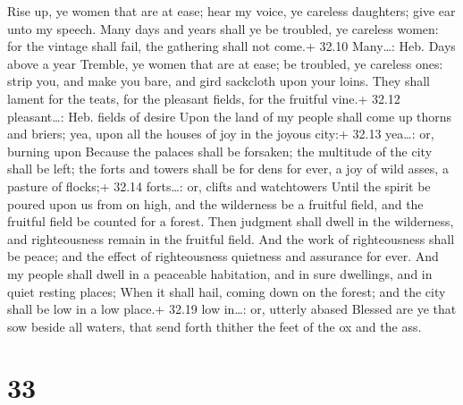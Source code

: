  Rise up, ye women that are at ease; hear my voice, ye
careless daughters; give ear unto my speech.  Many days and
years shall ye be troubled, ye careless women: for the vintage shall
fail, the gathering shall not come.+ 32.10 Many\ldots: Heb. Days above a
year  Tremble, ye women that are at ease; be troubled, ye
careless ones: strip you, and make you bare, and gird sackcloth upon
your loins.  They shall lament for the teats, for the
pleasant fields, for the fruitful vine.+ 32.12 pleasant\ldots: Heb.
fields of desire  Upon the land of my people shall come up
thorns and briers; yea, upon all the houses of joy in the joyous city:+
32.13 yea\ldots: or, burning upon  Because the palaces
shall be forsaken; the multitude of the city shall be left; the forts
and towers shall be for dens for ever, a joy of wild asses, a pasture of
flocks;+ 32.14 forts\ldots: or, clifts and watchtowers 
Until the spirit be poured upon us from on high, and the wilderness be a
fruitful field, and the fruitful field be counted for a forest.
 Then judgment shall dwell in the wilderness, and
righteousness remain in the fruitful field.  And the work
of righteousness shall be peace; and the effect of righteousness
quietness and assurance for ever.  And my people shall
dwell in a peaceable habitation, and in sure dwellings, and in quiet
resting places;  When it shall hail, coming down on the
forest; and the city shall be low in a low place.+ 32.19 low in\ldots:
or, utterly abased  Blessed are ye that sow beside all
waters, that send forth thither the feet of the ox and the ass.

\hypertarget{section-32}{%
\section{33}\label{section-32}}

